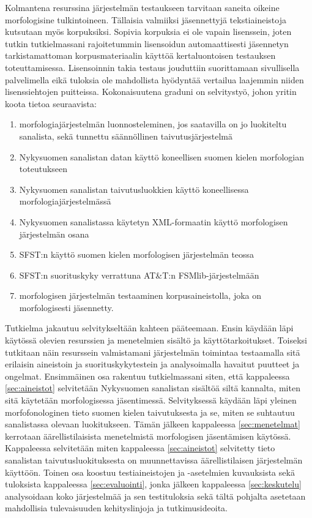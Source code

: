\documentclass[free]{flammie}
\begin{document}
Kolmantena resurssina järjestelmän testaukseen tarvitaan saneita oikeine
morfologisine tulkintoineen. Tällaisia valmiiksi jäsennettyjä tekstiaineistoja
kutsutaan myös korpuksiksi. Sopivia korpuksia ei ole vapain lisenssein, joten
tutkin tutkielmassani rajoitetummin lisensoidun automaattisesti jäsennetyn
tarkistamattoman korpusmateriaalin käyttöä kertaluontoisen testauksen
toteuttamisessa. Lisensoinnin takia testaus jouduttiin suorittamaan sivullisella
palvelimella eikä tuloksia ole mahdollista hyödyntää vertailua laajemmin niiden
lisenssiehtojen puitteissa.  Kokonaisuutena graduni on selvitystyö, johon yritin
koota tietoa seuraavista:

\begin{enumerate}
    \item  morfologiajärjestelmän luonnosteleminen, jos saatavilla on jo luokiteltu sanalista, sekä tunnettu säännöllinen taivutusjärjestelmä
    \item Nykysuomen sanalistan datan käyttö koneellisen suomen kielen morfologian toteutukseen
    \item Nykysuomen sanalistan taivutusluokkien käyttö koneellisessa morfologiajärjestelmässä
    \item Nykysuomen sanalistassa käytetyn XML-formaatin käyttö morfologisen järjestelmän osana
    \item SFST:n käyttö suomen kielen morfologisen järjestelmän teossa
    \item SFST:n suorituskyky verrattuna AT\&T:n FSMlib-järjestelmään
    \item morfologisen järjestelmän testaaminen korpusaineistolla, joka on morfologisesti jäsennetty.
\end{enumerate}




Tutkielma jakautuu selvitykseltään kahteen pääteemaan. Ensin käydään läpi
käytössä olevien resurssien ja menetelmien sisältö ja käyttötarkoitukset.
Toiseksi tutkitaan näin resurssein valmistamani järjestelmän toimintaa
testaamalla sitä erilaisin aineistoin ja suorituskykytestein ja analysoimalla
havaitut puutteet ja ongelmat. Ensimmäinen osa rakentuu tutkielmassani siten,
että kappaleessa \ref{sec:aineistot} selvitetään Nykysuomen sanalistan sisältöä
siltä kannalta, miten sitä käytetään morfologisessa jäsentimessä. Selvityksessä
käydään läpi yleinen morfofonologinen tieto suomen kielen taivutuksesta ja se,
miten se suhtautuu sanalistassa olevaan luokitukseen. Tämän jälkeen kappaleessa
\ref{sec:menetelmat} kerrotaan äärellistilaisista menetelmistä morfologisen
jäsentämisen käytössä.  Kappaleessa selvitetään miten kappaleessa
\ref{sec:aineistot} selvitetty tieto sanalistan taivutusluokituksesta on
muunnettavissa äärellistilaisen järjestelmän käyttöön.  Toinen osa koostuu
testiaineistojen ja -asetelmien kuvauksista sekä tuloksista kappaleessa
\ref{sec:evaluointi}, jonka jälkeen kappaleessa \ref{sec:keskutelu} analysoidaan
koko järjestelmää ja sen testituloksia sekä tältä pohjalta asetetaan mahdollisia
tulevaisuuden kehityslinjoja ja tutkimusideoita.
\end{document}
